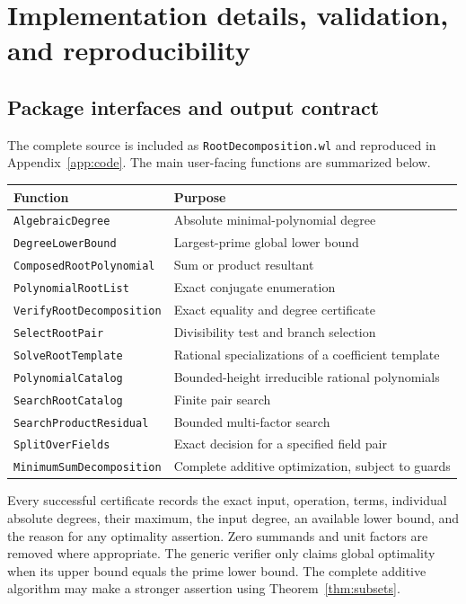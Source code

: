 \documentclass[11pt,letterpaper]{article}
\theoremstyle{definition}\newtheorem{definition}[theorem]{Definition}
\theoremstyle{remark}\newtheorem{remark}[theorem]{Remark}
\newcommand{\WL}[1]{\texttt{#1}}
\begin{document}
\section{Implementation details, validation, and reproducibility}
\label{sec:verification}
\subsection{Package interfaces and output contract}
The complete source is included as \WL{RootDecomposition.wl} and reproduced in Appendix~\ref{app:code}. The main user-facing functions are summarized below.
\begin{center}
\small
\begin{tabular}{p{}p{}}
\toprule
Function & Purpose\\\midrule
\WL{AlgebraicDegree} & Absolute minimal-polynomial degree\\
\WL{DegreeLowerBound} & Largest-prime global lower bound\\
\WL{ComposedRootPolynomial} & Sum or product resultant\\
\WL{PolynomialRootList} & Exact conjugate enumeration\\
\WL{VerifyRootDecomposition} & Exact equality and degree certificate\\
\WL{SelectRootPair} & Divisibility test and branch selection\\
\WL{SolveRootTemplate} & Rational specializations of a coefficient template\\
\WL{PolynomialCatalog} & Bounded-height irreducible rational polynomials\\
\WL{SearchRootCatalog} & Finite pair search\\
\WL{SearchProductResidual} & Bounded multi-factor search\\
\WL{SplitOverFields} & Exact decision for a specified field pair\\
\WL{MinimumSumDecomposition} & Complete additive optimization, subject to guards\\
\bottomrule
\end{tabular}
\end{center}

Every successful certificate records the exact input, operation, terms, individual absolute degrees, their maximum, the input degree, an available lower bound, and the reason for any optimality assertion. Zero summands and unit factors are removed where appropriate. The generic verifier only claims global optimality when its upper bound equals the prime lower bound. The complete additive algorithm may make a stronger assertion using Theorem~\ref{thm:subsets}.
\end{document}
